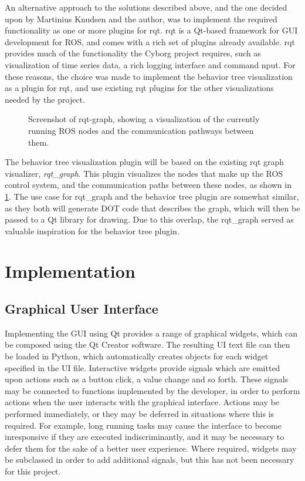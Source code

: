 \documentclass[\rootfolder/main.tex]{subfiles}
\begin{document}
An alternative approach to the solutions described above, and the one decided upon by Martinius Knudsen and the author, was to implement the required functionality as one or more plugins for rqt.
rqt is a Qt-based framework for GUI development for ROS, and comes with a rich set of plugins already available.
rqt provides much of the functionality the Cyborg project requires, such as visualization of time series data, a rich logging interface and command nput.
For these reasons, the choice was made to implement the behavior tree visualization as a plugin for rqt, and use existing rqt plugins for the other visualizations needed by the project.

\begin{figure}[ht]
    \caption{Screenshot of rqt-graph, showing a visualization of the currently running ROS nodes and the communication pathways between them.}
    \label{fig:rqt-graph}
\end{figure}

The behavior tree visualization plugin will be based on the existing rqt graph visualizer, \emph{rqt\_graph}.
This plugin visualizes the nodes that make up the ROS control system, and the communication paths between these nodes, as shown in \cref{fig:rqt-graph}.
The use case for rqt\_graph and the behavior tree plugin are somewhat similar, as they both will generate DOT code that describes the graph, which will then be passed to a Qt library for drawing.
Due to this overlap, the rqt\_graph served as valuable inspiration for the behavior tree plugin.


\section{Implementation}

\subsection{Graphical User Interface}

Implementing the GUI using Qt provides a range of graphical widgets, which can be composed using the Qt Creator software.
The resulting UI text file can then be loaded in Python, which automatically creates objects for each widget specified in the UI file.
Interactive widgets provide signals which are emitted upon actions such as a button click, a value change and so forth.
These signals may be connected to functions implemented by the developer, in order to perform actions when the user interacts with the graphical interface.
Actions may be performed immediately, or they may be deferred in situations where this is required.
For example, long running tasks may cause the interface to become inresponsive if they are executed indiscriminantly, and it may be necessary to defer them for the sake of a better user experience.
Where required, widgets may be subclassed in order to add additional signals, but this has not been necessary for this project.
\end{document}
